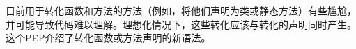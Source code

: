 \documentclass[../main.tex]{subfiles}
\begin{document}
目前用于转化函数和方法的方法（例如，将他们声明为类或静态方法）有些尴尬，并可能导致代码难以理解。理想化情况下，这些转化应该与转化的声明同时产生。这个PEP介绍了转化函数或方法声明的新语法。
\end{document}
